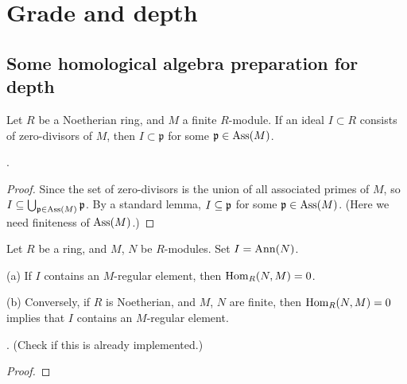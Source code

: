 	\section{Grade and depth}
	
	\subsection{Some homological algebra preparation for depth}
	
	
	\begin{proposition}
		Let $R$ be a Noetherian ring, and $M$ a finite $R$-module. If an ideal $I \subset R$ consists of zero-divisors of $M$, then $I \subset \mathfrak{p}$ for some $\mathfrak{p} \in \operatorname{Ass}(M)$.
		
		\cite[Proposition 1.2.1]{BH}.
	\end{proposition}
	\begin{proof}
		Since the set of zero-divisors is the union of all associated primes of $M$, so $I \subseteq \bigcup_{\mathfrak{p} \in \operatorname{Ass}(M)}\mathfrak{p}$. By a standard lemma, $I \subseteq \mathfrak{p}$ for some $\mathfrak{p} \in \operatorname{Ass}(M)$. (Here we need finiteness of $\operatorname{Ass}(M)$.)
	\end{proof}
	
	\begin{lemma}
		\label{L:hom(N,M)}
		Let $R$ be a ring, and $M$, $N$ be $R$-modules. Set $I = \operatorname{Ann}(N)$.
		
		(a) If $I$ contains an $M$-regular element, then $\operatorname{Hom}_R(N, M) = 0$.
		
		(b) Conversely, if $R$ is Noetherian, and $M$, $N$ are finite, then $\operatorname{Hom}_R(N, M) = 0$ implies that $I$ contains an $M$-regular element.
		
		\cite[Proposition 1.2.3]{BH}.
		(Check if this is already implemented.)
	\end{lemma}
	\begin{proof}
		
	\end{proof}
	
